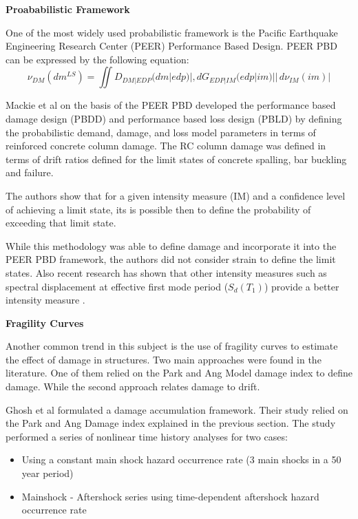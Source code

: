 \textbf{Proababilistic Framework}

One of the most widely used probabilistic framework is the Pacific Earthquake Engineering Research Center (PEER) Performance Based Design. PEER PBD can be expressed by the following equation:
\begin{equation}
\nu_{DM}(dm^{LS})=\iint D_{DM|EDP}(dm|edp)|,dG_{EDP|IM}(edp|im)||\,d\nu_{IM}(im)|
\end{equation}

Mackie et al \cite{Mackie2007} on the basis of the PEER PBD developed the performance based damage design (PBDD) and performance based loss design (PBLD) by defining the probabilistic demand, damage, and loss model parameters in terms of reinforced concrete column damage. The RC column damage was defined in terms of drift ratios defined for the limit states of concrete spalling, bar buckling and failure. 

The authors show that for a given intensity measure (IM) and a confidence level of achieving a limit state, its is possible then to define the probability  of exceeding that limit state.

While this methodology was able to define damage and incorporate it into the PEER PBD framework, the authors did not consider  strain to define the limit states. Also recent research has shown that other intensity measures such as spectral displacement at effective first mode period ($S_{d}(T_{1})$) provide a better intensity measure \cite{Krish2018}.

\textbf{Fragility Curves}

Another common trend in this subject is the use of fragility curves to estimate the effect of damage in structures. Two main approaches were found in the literature. One of them relied on the Park and Ang Model damage index to define damage. While the second approach relates damage to drift.

Ghosh et al \cite{Ghosh2015} formulated a damage accumulation framework. Their study relied on the Park and Ang Damage index explained in the previous section. The study performed a series of nonlinear time history analyses for two cases:

\begin{itemize}
	\item Using a constant main shock hazard occurrence rate (3 main shocks in a 50 year period)
	\item Mainshock - Aftershock series using time-dependent aftershock hazard occurrence rate
\end{itemize}

